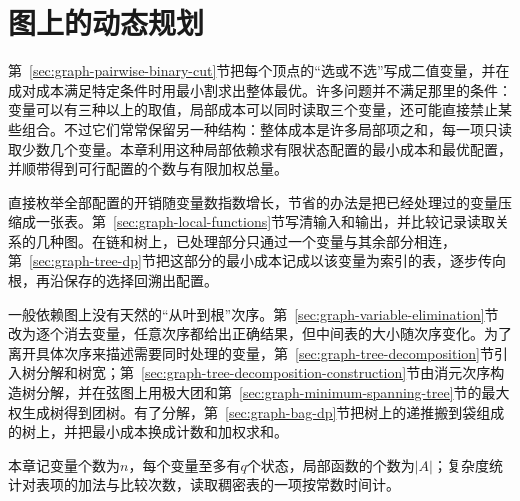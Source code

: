 \chapter{图上的动态规划}
\label{chap:graph-dynamic-programming}

第~\ref{sec:graph-pairwise-binary-cut}节把每个顶点的“选或不选”写成二值变量，并在成对成本满足特定条件时用最小割求出整体最优。许多问题并不满足那里的条件：变量可以有三种以上的取值，局部成本可以同时读取三个变量，还可能直接禁止某些组合。不过它们常常保留另一种结构：整体成本是许多局部项之和，每一项只读取少数几个变量。本章利用这种局部依赖求有限状态配置的最小成本和最优配置，并顺带得到可行配置的个数与有限加权总量。

直接枚举全部配置的开销随变量数指数增长，节省的办法是把已经处理过的变量压缩成一张表。第~\ref{sec:graph-local-functions}节写清输入和输出，并比较记录读取关系的几种图。在链和树上，已处理部分只通过一个变量与其余部分相连，第~\ref{sec:graph-tree-dp}节把这部分的最小成本记成以该变量为索引的表，逐步传向根，再沿保存的选择回溯出配置。

一般依赖图上没有天然的“从叶到根”次序。第~\ref{sec:graph-variable-elimination}节改为逐个消去变量，任意次序都给出正确结果，但中间表的大小随次序变化。为了离开具体次序来描述需要同时处理的变量，第~\ref{sec:graph-tree-decomposition}节引入树分解和树宽；第~\ref{sec:graph-tree-decomposition-construction}节由消元次序构造树分解，并在弦图上用极大团和第~\ref{sec:graph-minimum-spanning-tree}节的最大权生成树得到团树。有了分解，第~\ref{sec:graph-bag-dp}节把树上的递推搬到袋组成的树上，并把最小成本换成计数和加权求和。

本章记变量个数为$n$，每个变量至多有$q$个状态，局部函数的个数为$|A|$；复杂度统计对表项的加法与比较次数，读取稠密表的一项按常数时间计。








